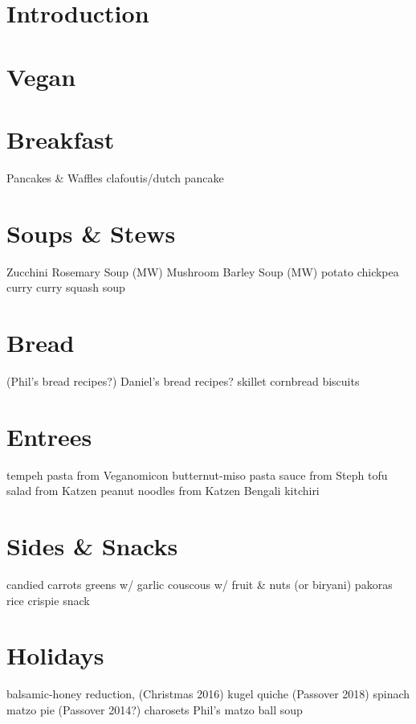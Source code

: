 \documentclass{article}
\begin{document}
\tableofcontents

\section{Introduction}


\section{Vegan}


\section{Breakfast}
% 



Pancakes \& Waffles
clafoutis/dutch pancake

\section{Soups \& Stews}

Zucchini Rosemary Soup (MW)
Mushroom Barley Soup (MW)
potato chickpea curry
curry squash soup

\section{Bread}
 (Phil’s bread recipes?)
Daniel’s bread recipes?
skillet cornbread
biscuits

\section{Entrees}
tempeh pasta from Veganomicon
butternut-miso pasta sauce from Steph
tofu salad from Katzen
peanut noodles from Katzen
Bengali kitchiri

\section{Sides \& Snacks}
candied carrots
greens w/ garlic
couscous w/ fruit \& nuts (or biryani)
pakoras
rice crispie snack

\section{Holidays}





balsamic-honey reduction, (Christmas 2016)
kugel quiche (Passover 2018)
spinach matzo pie (Passover 2014?)
charosets
Phil’s matzo ball soup
\end{document}
